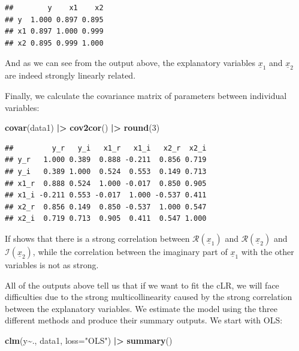 \documentclass[
]{book}
\newenvironment{Shaded}{\begin{snugshade}}{\end{snugshade}}
\newcommand{\DataTypeTok}[1]{\textcolor[rgb]{0.13,0.29,0.53}{#1}}
\newcommand{\DecValTok}[1]{\textcolor[rgb]{0.00,0.00,0.81}{#1}}
\newcommand{\ErrorTok}[1]{\textcolor[rgb]{0.64,0.00,0.00}{\textbf{#1}}}
\newcommand{\KeywordTok}[1]{\textcolor[rgb]{0.13,0.29,0.53}{\textbf{#1}}}
\newcommand{\NormalTok}[1]{#1}
\newcommand{\OperatorTok}[1]{\textcolor[rgb]{0.81,0.36,0.00}{\textbf{#1}}}
\newcommand{\StringTok}[1]{\textcolor[rgb]{0.31,0.60,0.02}{#1}}
\begin{document}
\begin{verbatim}
##        y    x1    x2
## y  1.000 0.897 0.895
## x1 0.897 1.000 0.999
## x2 0.895 0.999 1.000
\end{verbatim}

And as we can see from the output above, the explanatory variables \(\underline{x}_{1}\) and \(\underline{x}_{2}\) are indeed strongly linearly related.

Finally, we calculate the covariance matrix of parameters between individual variables:

\begin{Shaded}
\begin{Highlighting}[]
\KeywordTok{covar}\NormalTok{(data1) }\OperatorTok{|}\ErrorTok{\textgreater{}}\StringTok{ }\KeywordTok{cov2cor}\NormalTok{() }\OperatorTok{|}\ErrorTok{\textgreater{}}\StringTok{ }\KeywordTok{round}\NormalTok{(}\DecValTok{3}\NormalTok{)}
\end{Highlighting}
\end{Shaded}

\begin{verbatim}
##         y_r   y_i   x1_r   x1_i   x2_r  x2_i
## y_r   1.000 0.389  0.888 -0.211  0.856 0.719
## y_i   0.389 1.000  0.524  0.553  0.149 0.713
## x1_r  0.888 0.524  1.000 -0.017  0.850 0.905
## x1_i -0.211 0.553 -0.017  1.000 -0.537 0.411
## x2_r  0.856 0.149  0.850 -0.537  1.000 0.547
## x2_i  0.719 0.713  0.905  0.411  0.547 1.000
\end{verbatim}

If shows that there is a strong correlation between \(\mathcal{R}\left(\underline{x}_{1}\right)\) and \(\mathcal{R}\left(\underline{x}_{2}\right)\) and \(\mathcal{I}\left(\underline{x}_{2}\right)\), while the correlation between the imaginary part of \(\underline{x}_{1}\) with the other variables is not as strong.

All of the outputs above tell us that if we want to fit the cLR, we will face difficulties due to the strong multicollinearity caused by the strong correlation between the explanatory variables. We estimate the model using the three different methods and produce their summary outputs. We start with OLS:

\begin{Shaded}
\begin{Highlighting}[]
\KeywordTok{clm}\NormalTok{(y}\OperatorTok{\textasciitilde{}}\NormalTok{., data1, }\DataTypeTok{loss=}\StringTok{"OLS"}\NormalTok{) }\OperatorTok{|}\ErrorTok{\textgreater{}}
\StringTok{    }\KeywordTok{summary}\NormalTok{()}
\end{Highlighting}
\end{Shaded}
\end{document}
